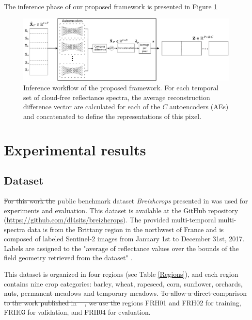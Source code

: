 \documentclass[journal,article,submit,pdftex,moreauthors]{Definitions/mdpi}
\providecommand{\DIFadd}[1]{{\protect\color{blue}\uwave{#1}}} %
\providecommand{\DIFdel}[1]{{\protect\color{red}\sout{#1}}}                      %
\providecommand{\DIFaddbegin}{} %
\providecommand{\DIFaddend}{} %
\providecommand{\DIFdelbegin}{} %
\providecommand{\DIFdelend}{} %
\begin{document}
The inference phase of our proposed framework is presented in Figure \ref{Inference}\DIFaddbegin \DIFadd{.
}\DIFaddend \begin{figure}[H]
	\centering
	\includegraphics[width=\textwidth]{figures/testing.pdf}
	\caption{Inference workflow of the proposed framework. For each temporal set of cloud-free reflectance spectra, the average reconstruction difference vector are calculated for each of the $C$ autoencoders (AEs) and concatenated to define the representations of this pixel.}
	\label{Inference}    
\end{figure}

\section{Experimental results}
\subsection{Dataset}\label{dataset}
\DIFdelbegin \DIFdel{For this work the }\DIFdelend \DIFaddbegin \DIFadd{The }\DIFaddend public benchmark dataset \textit{Breizhcrops} presented in \cite{Russwurm2020} was used for experiments and evaluation. This dataset is available at the GitHub repository
(\url{https://github.com/dl4sits/breizhcrops}). The provided multi-temporal multi-spectra data is from the Brittany region in the northwest of France and is composed of labeled Sentinel-2 images from January 1st to December 31st, 2017. Labels are assigned to the "average of reflectance values over the bounds of the field geometry retrieved from the dataset" \cite{Russwurm2020}.

This dataset is organized in four regions (see Table \ref{Regions}),
and each region contains nine crop categories: barley, wheat, rapeseed, corn, sunflower, orchards, nuts, permanent meadows and temporary meadows.
\DIFdelbegin \DIFdel{To allow a direct comparison to the work published in \mbox{%
\cite{Russwurm2020}}\hskip0pt%
, we use the }\DIFdelend \DIFaddbegin \DIFadd{In \mbox{%
\cite{Russwurm2020}}\hskip0pt%
, }\DIFaddend regions FRH01 and FRH02 \DIFaddbegin \DIFadd{were used }\DIFaddend for training, FRH03 for validation, and FRH04 for evaluation.
\end{document}
